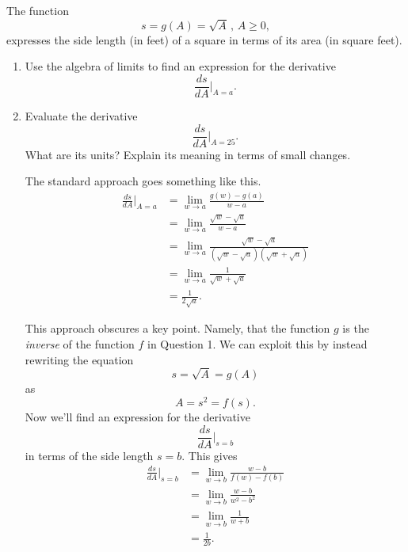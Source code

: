 \documentclass{ximera}
\begin{document}
\begin{question} \label{QDfg5rtghbcvdf}
The function 
\[
   s = g(A) =\sqrt{A} \, , \, A\geq 0 ,
\]
expresses the side length (in feet) of a square in terms of its area (in square feet).

\begin{enumerate}

\item Use the algebra of limits to find an expression for the derivative
\[
      \frac{ds}{dA}\Big|_{A=a}.
\]

\item Evaluate the derivative
\[
     \frac{ds}{dA}\Big|_{A=25}.
\]
What are its units? Explain its meaning in terms of small changes.

\begin{explanation}
The standard approach goes something like this.
\begin{align*}
    \frac{ds}{dA}\Big|_{A=a} &= \lim_{w\to a} \frac{g(w)-g(a)}{w-a} \\
                                             &= \lim_{w\to a} \frac{\sqrt{w}-\sqrt{a}}{w-a} \\
                                            &= \lim_{w\to a} \frac{\sqrt{w}-\sqrt{a}}{(\sqrt{w}-\sqrt{a})(\sqrt{w}+\sqrt{a})} \\
                                           &= \lim_{w\to a} \frac{1}{\sqrt{w}+\sqrt{a}} \\
                                            &= \frac{1}{2\sqrt{a}} .
\end{align*}

This approach obscures a key point. Namely, that the function $g$ is the \emph{inverse} of the function $f$ in Question 1. We can exploit this by instead rewriting the equation
\[
       s = \sqrt{A} = g(A)
\]
as 
\[
    A = s^2 = f(s).
\]
Now we'll find an expression for the derivative
\[
     \frac{ds}{dA}\Big|_{s=b}
\]
in terms of the side length $s=b$. This gives
\begin{align*}
        \frac{ds}{dA}\Big|_{s=b} &= \lim_{w\to b}\frac{w-b}{f(w) - f(b)} \\
                                              &=\lim_{w\to b}\frac{w-b}{w^2 - b^2}\\
                                              &=\lim_{w\to b}\frac{1}{w+b} \\
                                               &= \frac{1}{2b} .
\end{align*}


\end{explanation}
\end{enumerate}
\end{question}
\end{document}
